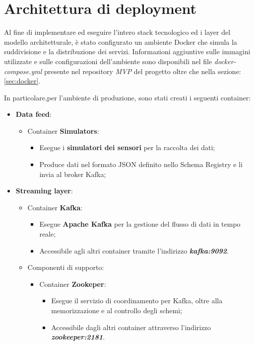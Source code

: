 \section{Architettura di deployment}

Al fine di implementare ed eseguire l'intero stack tecnologico ed i layer del modello architetturale, è stato configurato un ambiente Docker che simula la suddivisione e la distribuzione dei servizi.
Informazioni aggiuntive sulle immagini utilizzate e sulle configurazioni dell'ambiente sono disponibili nel file \textit{docker-compose.yml} presente nel repository \textit{MVP} del progetto oltre che nella sezione: \ref{sec:docker}.

In particolare,per l'ambiente di produzione, sono stati creati i seguenti container:
\begin{itemize}
    \item \textbf{Data feed}:
    \begin{itemize}
        \item Container \textbf{Simulators}: 
        \begin{itemize}
            \item Esegue i \textbf{simulatori dei sensori} per la raccolta dei dati;
            \item Produce dati nel formato JSON definito nello Schema Registry e li invia al broker Kafka;
        \end{itemize}
    \end{itemize} 
    \item \textbf{Streaming layer}:
    \begin{itemize}
        \item Container \textbf{Kafka}:  
        \begin{itemize}
            \item Esegue \textbf{Apache Kafka} per la gestione del flusso di dati in tempo reale;
            \item Accessibile agli altri container tramite l'indirizzo \textit{\textbf{kafka:9092}}.
        \end{itemize}
        \item Componenti di supporto:
       \begin{itemize}
        \item Container \textbf{Zookeper}:
        \begin{itemize}
            \item Esegue il servizio di coordinamento per Kafka, oltre alla memorizzazione e al controllo degli schemi;
            \item Accessibile dagli altri container attraverso l’indirizzo \textit{\textbf{zookeeper:2181}}.

\end{itemize}
\end{itemize}
\end{itemize}
\end{itemize}
